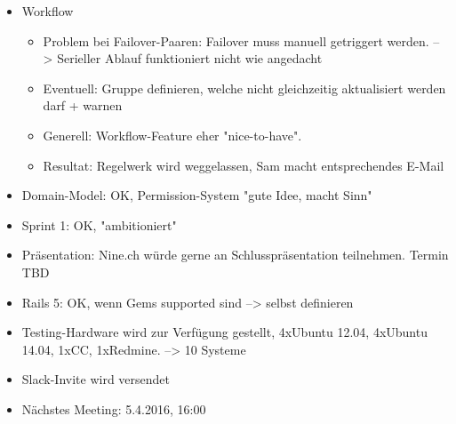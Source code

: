\documentclass[class=scrbook,crop=false]{standalone}
\begin{document}
	\begin{itemize}
        \item Workflow
        \begin{itemize}
            \item Problem bei Failover-Paaren: Failover muss manuell getriggert werden. --> Serieller Ablauf funktioniert nicht wie angedacht
            \item Eventuell: Gruppe definieren, welche nicht gleichzeitig aktualisiert werden darf + warnen
            \item Generell: Workflow-Feature eher "nice-to-have".
            \item Resultat: Regelwerk wird weggelassen, Sam macht entsprechendes E-Mail
        \end{itemize}
        \item Domain-Model: OK, Permission-System "gute Idee, macht Sinn"
        \item Sprint 1: OK, "ambitioniert"
        \item Präsentation: Nine.ch würde gerne an Schlusspräsentation teilnehmen. Termin TBD
        \item Rails 5: OK, wenn Gems supported sind --> selbst definieren
        \item Testing-Hardware wird zur Verfügung gestellt, 4xUbuntu 12.04, 4xUbuntu 14.04, 1xCC, 1xRedmine. --> 10 Systeme
        \item Slack-Invite wird versendet
        \item Nächstes Meeting: 5.4.2016, 16:00
    \end{itemize}
\end{document}
